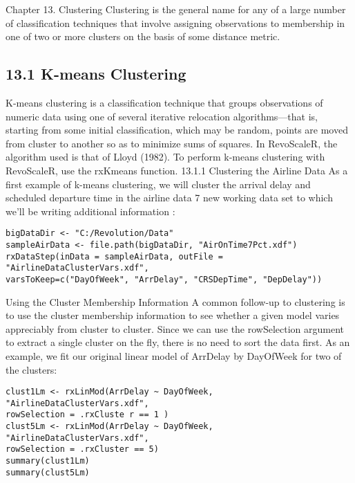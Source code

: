 Chapter 13.
Clustering
Clustering is the general name for any of a large number of classification techniques that
involve assigning observations to membership in one of two or more clusters on the basis of
some distance metric.
\subsection*{13.1 K-means Clustering}
K-means clustering is a classification technique that groups observations of numeric data using
one of several iterative relocation algorithms—that is, starting from some initial classification,
which may be random, points are moved from cluster to another so as to minimize sums of
squares. In RevoScaleR, the algorithm used is that of Lloyd (1982).
To perform k-means clustering with RevoScaleR, use the rxKmeans function.
13.1.1 Clustering the Airline Data
As a first example of k-means clustering, we will cluster the arrival delay and scheduled
departure time in the airline data 7%
new working data set to which we’ll be writing additional information :
\begin{framed}
\begin{verbatim}
bigDataDir <- "C:/Revolution/Data"
sampleAirData <- file.path(bigDataDir, "AirOnTime7Pct.xdf")
rxDataStep(inData = sampleAirData, outFile = "AirlineDataClusterVars.xdf",
varsToKeep=c("DayOfWeek", "ArrDelay", "CRSDepTime", "DepDelay"))

\end{verbatim}
\end{framed}


Using the Cluster Membership Information
A common follow-up to clustering is to use the cluster membership information to see whether
a given model varies appreciably from cluster to cluster. Since we can use the rowSelection
argument to extract a single cluster on the fly, there is no need to sort the data first. As an
example, we fit our original linear model of ArrDelay by DayOfWeek for two of the clusters:
\begin{framed}
\begin{verbatim}
clust1Lm <- rxLinMod(ArrDelay ~ DayOfWeek, "AirlineDataClusterVars.xdf",
rowSelection = .rxCluste r == 1 )
clust5Lm <- rxLinMod(ArrDelay ~ DayOfWeek, "AirlineDataClusterVars.xdf",
rowSelection = .rxCluster == 5)
summary(clust1Lm)
summary(clust5Lm)
\end{verbatim}
\end{framed}
